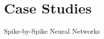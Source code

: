 \section{Case Studies}
\tableofcontents[currentsection]
\begin{frame}{Spike-by-Spike Neural Networks}
	
	
\end{frame}

